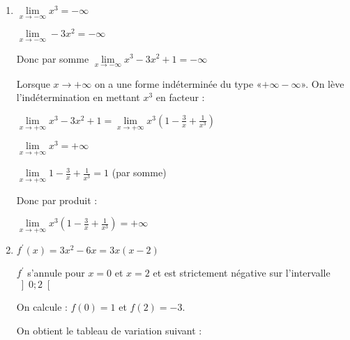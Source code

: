 \begin{corrige}
     \begin{enumerate}
          \item
          $\lim\limits_{x\rightarrow -\infty }x^{3}=-\infty $
          \par
          $\lim\limits_{x\rightarrow -\infty }-3x^{2}=-\infty $
          \par
          Donc par somme $\lim\limits_{x\rightarrow -\infty }x^{3}-3x^{2}+1=-\infty $
          \par
          Lorsque $x\rightarrow +\infty $ on a une forme indéterminée du type «$+\infty -\infty $». On lève l'indétermination en mettant $x^{3}$ en facteur :
          \par
          $\lim\limits_{x\rightarrow +\infty }x^{3}-3x^{2}+1=\lim\limits_{x\rightarrow +\infty }x^{3}\left(1-\frac{3}{x}+\frac{1}{x^{3}}\right)$
          \par
          $\lim\limits_{x\rightarrow +\infty }x^{3}=+\infty $
          \par
          $\lim\limits_{x\rightarrow +\infty }1-\frac{3}{x}+\frac{1}{x^{3}}=1$ (par somme)
          \par
          Donc par produit :
          \par
          $\lim\limits_{x\rightarrow +\infty }x^{3}\left(1-\frac{3}{x}+\frac{1}{x^{3}}\right)=+\infty $
          \item
          $f^{\prime}\left(x\right)=3x^{2}-6x=3x\left(x-2\right)$
          \par
          $f^{\prime}$ s'annule pour $x=0$ et $x=2$ et est strictement négative sur l'intervalle $\left]0 ; 2\right[$
          \par
          On calcule : $f\left(0\right)=1$ et $f\left(2\right)=-3$.
          \par
          On obtient le tableau de variation suivant :
\begin{center}
 \begin{extern}%
\end{extern}
\end{center}
\end{enumerate}
\end{corrige}
